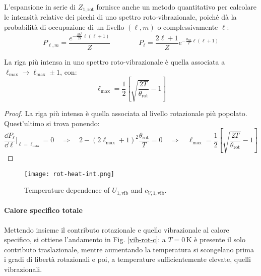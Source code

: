 L'espansione in serie di $ Z_{1,\text{rot}} $ fornisce anche un metodo quantitativo per calcolare le intensità relative dei picchi di uno spettro roto-vibrazionale, poiché dà la probabilità di occupazione di un livello $ (\ell,m) $ o complessivamente $ \ell $:
\begin{equation}
	P_{\ell,m} = \frac{e^{- \frac{\beta \hbar^2}{2I} \ell (\ell + 1)}}{Z}
	\qquad \qquad
	P_\ell = \frac{2\ell + 1}{Z} e^{- \frac{\theta_\text{rot}}{T} \ell (\ell + 1)}
\end{equation}

\begin{proposition}{}{}
	La riga più intensa in uno spettro roto-vibrazionale è quella associata a $ \ell_\text{max} \rightarrow \ell_\text{max} \pm 1 $, con:
	\begin{equation}
		\ell_\text{max} = \frac{1}{2} \left[ \sqrt{\frac{2T}{\theta_\text{rot}}} - 1 \right]
	\end{equation}

	\tcblower

	\begin{proof}
		La riga più intensa è quella associata al livello rotazionale più popolato. Quest'ultimo si trova ponendo:
		\begin{equation*}
			\frac{\dd P_\ell}{\dd \ell}\bigg\vert_{\ell = \ell_\text{max}} = 0
			\quad \Rightarrow \quad
			2 - (2 \ell_\text{max} + 1)^2 \frac{\theta_\text{rot}}{T} = 0
			\quad \Rightarrow \quad
			\ell_\text{max} = \frac{1}{2} \left[ \sqrt{\frac{2T}{\theta_\text{rot}}} - 1 \right]
		\end{equation*}
	\end{proof}
\end{proposition}

\begin{figure}
	\centering
	\texttt{[image: rot-heat-int.png]}
	\caption{Temperature dependence of $ U_{1,\text{vib}} $ and $ c_{V,1,\text{vib}} $.}
	\label{rot-heat-int}
\end{figure}

\paragraph{Calore specifico totale}

Mettendo insieme il contributo rotazionale e quello vibrazionale al calore specifico, si ottiene l'andamento in Fig. \ref{vib-rot-c}: a $ T = 0 \,\text{K} $ è presente il solo contributo traslazionale, mentre aumentando la temperatura si scongelano prima i gradi di libertà rotazionali e poi, a temperature sufficientemente elevate, quelli vibrazionali.

